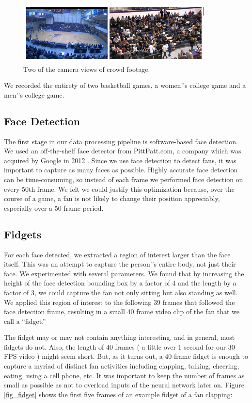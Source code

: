 \documentclass[times, 10pt,twocolumn]{article}
\begin{document}
\begin{figure}[bt]
\centering
\includegraphics[width=0.96\columnwidth]{cams}
\caption{\label{fig_cams} \small Two of the camera views of crowd footage. }
\end{figure}

We recorded the entirety of two basketball games, a women’'s college game and a men’'s college game.

\subsection{Face Detection}
\label{sec_facedet}

The first stage in our data processing pipeline is software-based face detection.  We used an off-the-shelf face detector from PittPatt.com, a company which was acquired by Google in 2012 \cite{pittpattgoogle}.  Since we use face detection to detect fans, it was important to capture as many faces as possible.  Highly accurate face detection can be time-consuming, so instead of each frame we performed face detection on every 50th frame.  We felt we could justify this optimization because, over the course of a game, a fan is not likely to change their position appreciably, especially over a 50 frame period.  
\subsection{Fidgets}
\label{sec_fidgets}

For each face detected, we extracted a region of interest larger than the face itself.  This was an attempt to capture the person'’s entire body, not just their face.  We experimented with several parameters.  We found that by increasing the height of the face detection bounding box by a factor of 4 and the length by a factor of 3, we could capture the fan not only sitting but also standing as well.  We applied this region of interest to the following 39 frames that followed the face detection frame, resulting in a small 40 frame video clip of the fan that we call a ``fidget.''

The fidget may or may not contain anything interesting, and in general, most fidgets do not.  Also, the length of 40 frames ( a little over 1 second for our 30 FPS video ) might seem short.  But, as it turns out, a 40-frame fidget is enough to capture a myriad of distinct fan activities including clapping, talking, cheering, eating, using a cell phone, etc.  It was important to keep the number of frames as small as possible as not to overload inputs of the neural network later on.  Figure \ref{fig_fidget} shows the first five frames of an example fidget of a fan clapping:
\end{document}
